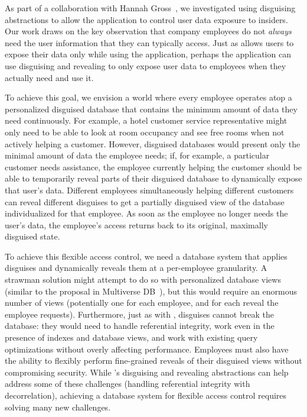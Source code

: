 %
As part of a collaboration with Hannah Gross~\cite{funhouse}, we investigated
using disguising abstractions to allow the application to control user data
exposure to insiders.
%
Our work draws on the key observation that company employees do not \emph{always}
need the user information that they can typically access.
%
Just as \sys allows users to expose their data only while using the application,
perhaps the application can use disguising and revealing to only expose user
data to employees when they actually need and use it.
%

%
To achieve this goal, we envision a world where every employee operates atop a
personalized disguised database that contains the minimum amount of data they
need continuously. For example, a hotel customer service representative might
only need to be able to look at room occupancy and see free rooms when not
actively helping a customer.
%
%
However, disguised databases would present only the minimal amount of data the
employee needs; if, for example, a particular customer needs assistance, the
employee currently helping the customer should be able to temporarily reveal
parts of their disguised database to dynamically expose that user's data.
%
Different employees simultaneously helping different customers can reveal
different disguises to get a partially disguised view of the database
individualized for that employee.
%
As soon as the employee no longer needs the user's data, the employee’s access
returns back to its original, maximally disguised state.
%

%
To achieve this flexible access control, we need a database
system that applies disguises and dynamically reveals them at a per-employee
granularity.
%
A strawman solution might attempt to do so with personalized database views
(similar to the proposal in Multiverse DB~\cite{multiverse}), but this would
require an enormous number of views (potentially one for each employee, and for
each reveal the employee requests).
%
Furthermore, just as with \sys, disguises cannot break the database: they would
need to handle referential integrity, work even in the presence of indexes and
database views, and work with existing query optimizations without overly
affecting performance.
%
Employees must also have the ability to flexibly perform fine-grained reveals of
their disguised views without compromising security.
%
While \sys's disguising and revealing abstractions can help address some of
these challenges (\eg handling referential integrity with decorrelation),
achieving a database system for flexible access control requires solving many
new challenges.

